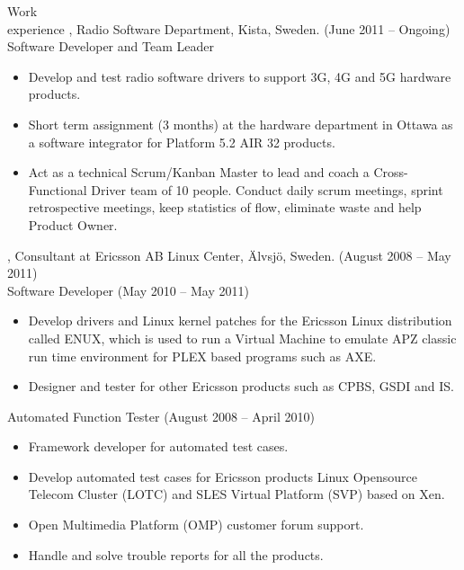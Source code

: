 \documentclass{../../cls/cv}
\author{Samuel Gabrielsson - Curriculum Vitae}
\begin{document}
\maketitle

\begin{category}{Work \\experience}
, Radio Software Department, Kista, Sweden. (June 2011 -- Ongoing)\\
Software Developer and Team Leader
\begin{itemize}
   \item Develop and test radio software drivers to support 3G, 4G and 5G hardware products.
   \item Short term assignment (3 months) at the hardware department in Ottawa as a software integrator for Platform 5.2 AIR 32 products.
   \item Act as a technical Scrum/Kanban Master to lead and coach a Cross-Functional Driver team of 10 people. Conduct daily scrum meetings, sprint retrospective meetings, keep statistics of flow, eliminate waste and help Product Owner.
\end{itemize}

, Consultant at Ericsson AB Linux Center, \"Alvsj\"o, Sweden. (August 2008 -- May 2011)\\
Software Developer (May 2010 -- May 2011)
\begin{itemize}
   \item Develop drivers and Linux kernel patches for the Ericsson Linux distribution called ENUX, which is used to run a Virtual Machine to emulate APZ classic run time environment for PLEX based programs such as AXE.
   \item Designer and tester for other Ericsson products such as CPBS, GSDI and IS.
\end{itemize}
Automated Function Tester (August 2008 -- April 2010)
\begin{itemize}
   \item Framework developer for automated test cases.
   \item Develop automated test cases for Ericsson products Linux Opensource Telecom Cluster (LOTC) and SLES Virtual Platform (SVP) based on Xen.
   \item Open Multimedia Platform (OMP) customer forum support.
   \item Handle and solve trouble reports for all the products.
\end{itemize}


\end{category}
\end{document}
